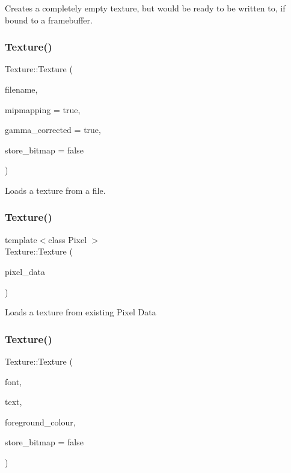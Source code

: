 Creates a completely empty texture, but would be ready to be written to, if bound to a framebuffer. \mbox{\label{class_texture_a84ada24c7d5dec8fca128752a6459106}} 
\subsubsection{\texorpdfstring{Texture()}{Texture()}\hspace{0.1cm}{\footnotesize\ttfamily [3/5]}}
{\footnotesize\ttfamily Texture\+::\+Texture (\begin{DoxyParamCaption}\item[{std\+::string}]{filename,  }\item[{bool}]{mipmapping = {\ttfamily true},  }\item[{bool}]{gamma\+\_\+corrected = {\ttfamily true},  }\item[{bool}]{store\+\_\+bitmap = {\ttfamily false} }\end{DoxyParamCaption})}

Loads a texture from a file. \mbox{\label{class_texture_a503b9fb36275ab110763bf9f51420539}} 
\subsubsection{\texorpdfstring{Texture()}{Texture()}\hspace{0.1cm}{\footnotesize\ttfamily [4/5]}}
{\footnotesize\ttfamily template$<$class Pixel $>$ \\
Texture\+::\+Texture (\begin{DoxyParamCaption}\item[{\mbox{\hyperlink{class_bitmap}{Bitmap}}$<$ Pixel $>$}]{pixel\+\_\+data }\end{DoxyParamCaption})}

Loads a texture from existing Pixel Data \mbox{\label{class_texture_a38ee78c007ed592860dc4c35948f57da}} 
\subsubsection{\texorpdfstring{Texture()}{Texture()}\hspace{0.1cm}{\footnotesize\ttfamily [5/5]}}
{\footnotesize\ttfamily Texture\+::\+Texture (\begin{DoxyParamCaption}\item[{const \mbox{\hyperlink{class_font}{Font}} \&}]{font,  }\item[{const std\+::string \&}]{text,  }\item[{S\+D\+L\+\_\+\+Color}]{foreground\+\_\+colour,  }\item[{bool}]{store\+\_\+bitmap = {\ttfamily false} }\end{DoxyParamCaption})}

